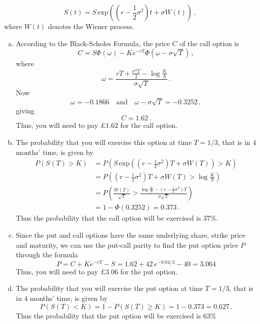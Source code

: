 \documentclass[11pt,a4paper]{article}
\begin{document}
    $$
    S(t) = S\, \text{exp}\left(\left(r-\frac{1}{2}\sigma^2\right)t+\sigma W(t)\right)\, ,
    $$
    where $W(t)$ denotes the Wiener process.
    \begin{enumerate}[(a)]
        \item According to the Black-Scholes Formula, the price $C$ of the call option is
        $$
        C = S\Phi(\omega)-Ke^{-rT}\Phi(\omega-\sigma\sqrt{T})\, ,
        $$
        where
        $$
        \omega = \frac{rT+\frac{\sigma^2T}{2}-\log\frac{K}{S}}{\sigma \sqrt{T}}\, .
        $$
        Now
        $$
        \omega = −0.1866\quad \text{and}\quad \omega − \sigma \sqrt{T} = −0.3252\, ,
        $$
        giving
        $$
        C = 1.62\, .
        $$
        Thus, you will need to pay $\pounds 1.62$ for the call option.
        \item The probability that you will exercise this option at time $T = 1/3$, that is in $4$ months’ time, is given by
        \begin{align*}
            P(S(T)>K)
            &= P(S\, \text{exp}\left(\left(r-\frac{1}{2}\sigma^2\right)T+\sigma W(T)\right)>K)\\
            &= P\left(\left(r-\frac{1}{2}\sigma^2\right)T+\sigma W(T)> \log\frac{K}{S}\right)\\
            &= P\left(\frac{W(T)}{\sqrt{T}} > \frac{\log\frac{K}{S}-\left(r-\frac{1}{2}
            \sigma^2\right)T}{\sigma \sqrt{T}}\right)\\
            &= 1-\Phi(0.3252) = 0.373\, .
        \end{align*}
        Thus the probability that the call option will be exercised is $37\%$.
        \item Since the put and call options have the same underlying share, strike price and maturity, we can use the put-call parity to find the put option price $P$ through the formula
        $$
        P = C+Ke^{-rT}-S = 1.62+42\, e^{-0.04/3}-40 = 3.064
        $$
        Thus, you will need to pay $\pounds 3.06$ for the put option.
        \item The probability that you will exercise the put option at time $T = 1/3$, that is in $4$ months’ time, is given by
        $$
        P(S(T) < K) = 1 − P(S(T) \geq K) = 1 − 0.373 = 0.627\, .
        $$
        Thus the probability that the put option will be exercised is $63\%$
    \end{enumerate}
\end{document}
